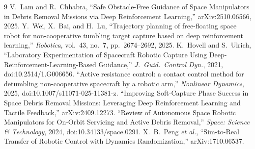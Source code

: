 \documentclass[conference]{IEEEtran}
\begin{document}
\begin{thebibliography}{9}
 V.\ Lam and R.\ Chhabra, ``Safe Obstacle-Free Guidance of Space Manipulators
in Debris Removal Missions via Deep Reinforcement Learning,'' arXiv:2510.06566, 2025.
 Y.\ Wei, X.\ Bai, and H.\ Lu, ``Trajectory planning of free-floating space
robot for non-cooperative tumbling target capture based on deep reinforcement learning,''
\textit{Robotica}, vol.\ 43, no.\ 7, pp.\ 2674--2692, 2025.
 K.\ Hovell and S.\ Ulrich, ``Laboratory Experimentation of Spacecraft Robotic
Capture Using Deep-Reinforcement-Learning-Based Guidance,'' \textit{J.\ Guid.\ Control Dyn.}, 2021,
doi:10.2514/1.G006656.
 ``Active resistance control: a contact control method for detumbling
non-cooperative spacecraft by a robotic arm,'' \textit{Nonlinear Dynamics}, 2025,
doi:10.1007/s11071-025-11381-z.
 ``Improving Soft-Capture Phase Success in Space Debris Removal Missions:
Leveraging Deep Reinforcement Learning and Tactile Feedback,'' arXiv:2409.12273.
 ``Review of Autonomous Space Robotic Manipulators for On-Orbit Servicing and
Active Debris Removal,'' \textit{Space: Science \& Technology}, 2024, doi:10.34133/space.0291.
 X.\ B.\ Peng \textit{et al.}, ``Sim-to-Real Transfer of Robotic Control with
Dynamics Randomization,'' arXiv:1710.06537.
\end{thebibliography}
\end{document}
